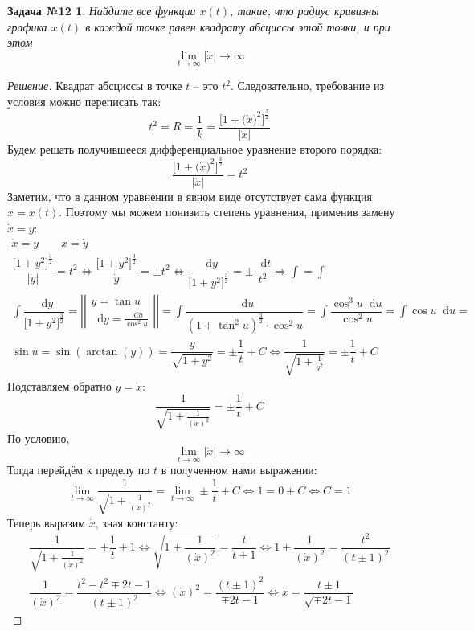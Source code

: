 \documentclass[a4paper,12pt]{article}
\newtheorem*{task12}{Задача №12}
\renewcommand*\d{\mathop{}\!\mathrm{d}}
\newcommand{\dy}{\dot{y}}
\newcommand{\dx}{\dot{x}}
\newcommand{\ddx}{\ddot{x}}
\renewcommand{\to}{\longrightarrow}
\newcommand{\bto}{\Longrightarrow}
\newcommand{\ds}{\displaystyle}
\begin{document}
\begin{task12}
	Найдите все функции $x(t)$, такие, что радиус кривизны графика $x(t)$ в каждой точке равен квадрату абсциссы этой точки, и при этом 
	\[\lim\limits_{t \to \infty} |\dx| \to \infty\]
\end{task12}
\begin{proof}[Решение]
	Квадрат абсциссы в точке $t$ -- это $t^2$. Следовательно, требование из условия можно переписать так:
	\[t^2 = R = \dfrac{1}{k} = \dfrac{\Big[1 + \big(\dx\big)^2\Big]^\frac{3}{2}}{|\ddx|}\]
	Будем решать получившееся дифференциальное уравнение второго порядка:
	\[
	\dfrac{\Big[1 + \big(\dx\big)^2\Big]^\frac{3}{2}}{|\ddx|} = t^2
	\]
	Заметим, что в данном уравнении в явном виде отсутствует сама функция $x = x(t)$. Поэтому мы можем понизить степень уравнения, применив замену $\dx = y$:
	\begin{gather*}
	\dx = y \qquad \ddx = \dy\\
	\dfrac{\Big[1 + y^2\Big]^\frac{3}{2}}{|\dy|} = t^2 \iff \dfrac{\Big[1 + y^2\Big]^\frac{3}{2}}{\dy} = \pm t^2 \iff \dfrac{\d y}{\Big[1 + y^2\Big]^\frac{3}{2}} = \pm\dfrac{\d t}{t^2} \bto \ds\int = \int\\
	\ds\int \dfrac{\d y}{\Big[1 + y^2\Big]^\frac{3}{2}} = \left|\left|\begin{gathered}
	y = \tan u\\
	\d y = \frac{\d u}{\cos^2 u}
	\end{gathered}\right|\right| = \ds\int\dfrac{\d u }{\left(1 + \tan^2 u\right)^\frac{3}{2}\cdot \cos^2 u} =  \ds\int \dfrac{\cos^3 u\d u}{\cos^2 u}= \ds\int \cos u\d u =  \\
	\sin u = \sin(\arctan(y)) = \dfrac{y}{\sqrt{1 + y^2}} =  \pm \dfrac{1}{t} + C \iff \dfrac{1}{\sqrt{1 + \frac{1}{y^2}}} = \pm \dfrac{1}{t} + C
	\end{gather*}
	Подставляем обратно $y = \dx$:
	\[\dfrac{1}{\sqrt{1 + \frac{1}{(\dx)^2}}} = \pm \dfrac{1}{t} + C\]
	По условию, 
	\[\lim\limits_{t \to \infty} |\dx| \to \infty\]
	Тогда перейдём к пределу по $t$ в полученном нами выражении:
	\[
	\lim\limits_{t \to \infty }\dfrac{1}{\sqrt{1 + \frac{1}{(\dx)^2}}} = \lim\limits_{t \to \infty }\pm \dfrac{1}{t} + C \iff 
	1 = 0 + C \iff C = 1
	\]
	Теперь выразим $\dx$, зная константу:
	\begin{gather*}
	\dfrac{1}{\sqrt{1 + \frac{1}{(\dx)^2}}} = \pm \dfrac{1}{t} + 1 \iff \sqrt{1 + \dfrac{1}{(\dx)^2}} = \dfrac{t}{t \pm 1} \iff 1 + \dfrac{1}{(\dx)^2} = \dfrac{t^2}{(t \pm 1)^2}\\
	\dfrac{1}{(\dx)^2} = \dfrac{t^2 - t^2 \mp 2t - 1}{(t \pm 1)^2} \iff (\dx)^2 = \dfrac{(t \pm 1)^2}{\mp 2t - 1} \iff \dx = \dfrac{t\pm 1}{\sqrt{\mp 2t - 1}}

\end{gather*}
\end{proof}
\end{document}
